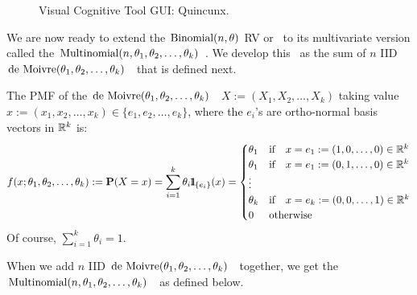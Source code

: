 \begin{figure}[htpb]
\caption{Visual Cognitive Tool GUI: Quincunx.\label{F:guiMultinomialQuincunx}}
\centering   {}
\end{figure}

We are now ready to extend the $\mbox{{\rm Binomial}}(n,\theta)$ RV or \rv~to its multivariate version called the $\mbox{{\rm Multinomial}}(n,\theta_1,\theta_2,\ldots,\theta_k)$ \rv.  We develop this \rv~as the sum of $n$ IID $\mbox{{\rm de~Moivre}}(\theta_1,\theta_2,\ldots,\theta_k)$ \rv~that is defined next.

\begin{model}\label{M:deMoivreRVec}
The PMF of the $\mbox{{\rm de~Moivre}}(\theta_1,\theta_2,\ldots,\theta_k)$ \rv~$X := (X_1,X_2,\ldots,X_k)$ taking value $x := (x_1,x_2,\ldots,x_k) \in \{e_1,e_2,\ldots,e_k\}$, where the $e_i$'s are ortho-normal basis vectors in $\mathbb{R}^k$ is:
\[
f(x;\theta_1,\theta_2,\ldots,\theta_k) := \mathbf{P}(X=x) = \sum_{i=1}^k \theta_i {1}\mspace{-11 mu}{1}_{\{e_i\}}(x) =
\begin{cases}
\theta_1 & \text{if} \quad x=e_1:=(1,0,\ldots,0) \in \mathbb{R}^k \\
\theta_1 & \text{if} \quad x=e_1:=(0,1,\ldots,0) \in  \mathbb{R}^k \\
\vdots \\
\theta_k & \text{if} \quad x=e_k:=(0,0,\ldots,1) \in  \mathbb{R}^k \\
0 & \text{otherwise}
\end{cases}
\]
Of course, $\sum_{i=1}^k \theta_i = 1$.
\end{model}

When we add $n$ IID $\mbox{{\rm de~Moivre}}(\theta_1,\theta_2,\ldots,\theta_k)$ \rv~together, we get the $\mbox{{\rm Multinomial}}(n,\theta_1,\theta_2,\ldots,\theta_k)$ \rv~as defined below.

